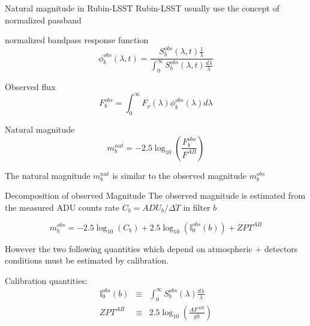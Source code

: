 \documentclass{beamer}
\begin{document}
\begin{frame}{Natural magnitude in Rubin-LSST}
Rubin-LSST usually use the concept of normalized passband
\begin{alertblock}{normalized bandpass response function}
\begin{equation}
\phi_b^{obs} (\lambda,t) = \frac{S_b^{obs}(\lambda,t)\frac{1}{\lambda}}{\int_0^\infty S^{obs}_b(\lambda,t) \frac{d\lambda}{\lambda}}
\end{equation}
\end{alertblock}
\begin{block}{Observed flux}
\begin{equation}
F_b^{obs} = \int_0^\infty F_\nu(\lambda) \phi_b^{obs}(\lambda) d\lambda
\end{equation}
\end{block}
\begin{exampleblock}{Natural magnitude}
\begin{equation}
m_b^{nat} = -2.5 \log_{10} \left( \frac{F_b^{obs}}{F^{AB}}\right)
\end{equation}
\end{exampleblock}
The natural magnitude $m_b^{nat}$ is similar to  the observed magnitude $m_b^{obs}$
\end{frame}



\begin{frame}{Decomposition of observed Magnitude} 
The observed magnitude is estimated from the measured ADU counts rate $C_b=ADU_b/\Delta T$ in filter $b$
\begin{alertblock}{}
\begin{equation}
m^{obs}_b = -2.5 \log_{10}(C_b)+ 2.5 \log_{10}\left(\mathbb{I}_0^{obs}(b)\right) + ZPT^{AB}
\end{equation}	
\end{alertblock}	
However the two following quantities which depend on atmospheric + detectors conditions must be estimated by calibration. 
\begin{block}{Calibration quantities:}
\begin{eqnarray}
\mathbb{I}_0^{obs}(b) & \equiv & \int_0^\infty S^{obs}_b(\lambda) \frac{d\lambda}{\lambda} \\
ZPT^{AB} & \equiv & 2.5 \log_{10} \left( \frac{A F^{AB}}{gh}\right)
\end{eqnarray} 
\end{block}

\end{frame}
\end{document}
